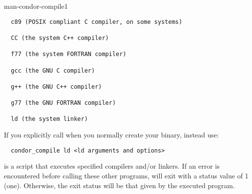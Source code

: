 \begin{ManPage}{}{man-condor-compile}{1}
\begin{verbatim}
  c89 (POSIX compliant C compiler, on some systems) 

  CC (the system C++ compiler) 

  f77 (the system FORTRAN compiler) 

  gcc (the GNU C compiler) 

  g++ (the GNU C++ compiler) 

  g77 (the GNU FORTRAN compiler) 

  ld (the system linker) 
\end{verbatim}
\normalsize

\Note If you explicitly call  when you normally create
your binary, instead use:
\footnotesize
\begin{verbatim}
  condor_compile ld <ld arguments and options>
\end{verbatim}
\normalsize

\ExitStatus

 is a script that executes specified compilers and/or linkers.
If an error is encountered before calling these other programs,
 will exit with a status value of 1 (one).
Otherwise, the exit status will be that given by the executed program.

\end{ManPage}
